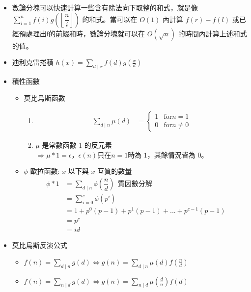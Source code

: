 \begin{itemize}
\item 數論分塊可以快速計算一些含有除法向下取整的和式，就是像 $\sum_{i = 1} ^ {n} f(i) g(\left\lfloor\dfrac ni\right\rfloor)$ 的和式。當可以在 $O(1)$ 內計算 $f(r) - f(l)$ 或已經預處理出f的前綴和時，數論分塊就可以在 $O(\sqrt n)$ 的時間內計算上述和式的值。
\item 迪利克雷捲積 $h(x) = \sum_{d \mid x} f(d) g(\frac{x}{d})$
\item 積性函數
    \begin{itemize}
        \item 莫比烏斯函數
            \begin{enumerate}
                \item 
                $$ \begin{aligned}
                    \sum_{d \mid n} \mu (d)
                    &=
                    \begin{cases}
                        1 & \text{for} n = 1\\
                        0 & \text{for} n \neq 0
                    \end{cases}
                \end{aligned} $$

                \item
                $\mu$ 是常數函數 $1$ 的反元素\\
                $\Rightarrow \mu \ast 1 = \epsilon$，$\epsilon (n) \text{只在} n = 1 \text{時為 1，其餘情況皆為 0。}$\\[5pt]
            \end{enumerate}

        \item $\phi$ 歐拉函數: $x$ 以下與 $x$ 互質的數量
        $$ \begin{aligned}
            \phi \ast 1
            &= \sum_{d \mid n} \phi(\dfrac {n}{d}) \ \ \text{質因數分解}\\
            &= \sum_{i = 0} ^ {c} \phi(p ^ i)\\
            &= 1 + p^0(p-1) + p^1(p-1) + ... + p^{c-1}(p-1)\\
            &= p^c\\
            &= id
        \end{aligned} $$
    \end{itemize}

\item 莫比烏斯反演公式
    \begin{itemize}
        \item $f(n)=\sum_{d\mid n}g(d)\Leftrightarrow g(n)=\sum_{d\mid n}\mu(d)f(\frac{n}{d})$
        \item $f(n)=\sum_{n\mid d}g(d)\Leftrightarrow g(n)=\sum_{n\mid d}\mu(\frac{d}{n})f(d)$
    \end{itemize}


\end{itemize}
